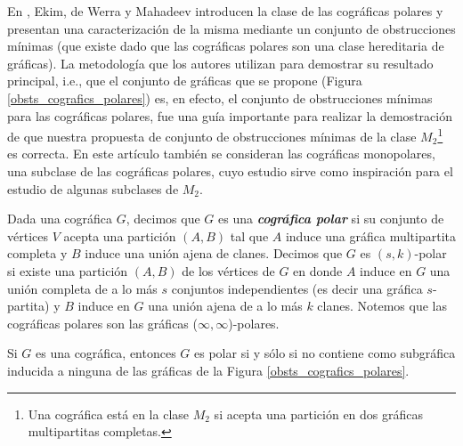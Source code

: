 En \cite{Ekim}, Ekim, de Werra y Mahadeev introducen
la clase de las cográficas polares y presentan una
caracterizaci\'on de la misma mediante un conjunto de
obstrucciones mínimas (que existe dado que las
cográficas polares son una clase hereditaria de gráficas).
La metodología que los autores utilizan para demostrar su
resultado principal, i.e., que el conjunto de gráficas que
se propone (Figura \ref{obsts_cografics_polares}) es, en
efecto, el conjunto de obstrucciones mínimas para las
cográficas polares, fue una gu\'ia importante para realizar
la demostración de que nuestra propuesta de conjunto de
obstrucciones mínimas de la clase $M_2$\footnote{Una
cogr\'afica est\'a en la clase $M_2$ si acepta una
partición en dos gráficas multipartitas completas.} es
correcta.   En este artículo también se consideran las
cográficas monopolares, una subclase de las cográficas
polares, cuyo estudio sirve como inspiración para el
estudio de algunas subclases de $M_2$.

Dada una cogr\'afica $G$, decimos que $G$ es una
\emph{\textbf{cográfica polar}} si su conjunto de vértices
$V$ acepta una partición $(A,B)$ tal que $A$ induce una
gráfica multipartita completa y $B$ induce una unión ajena
de clanes. Decimos que $G$ es $(s,k)$-polar si existe una
partición $(A,B)$ de los vértices de $G$ en donde $A$ induce
en $G$ una unión completa de a lo más $s$ conjuntos
independientes (es decir una gráfica $s$-partita) y $B$
induce en $G$ una unión ajena de a lo más $k$ clanes. Notemos
que las cográficas polares son las gráficas ($\infty,
\infty$)-polares.

\begin{theorem}
  Si $G$ es una cográfica, entonces $G$ es polar si y sólo
  si no contiene como subgráfica inducida a ninguna de las
  gráficas de la Figura \ref{obsts_cografics_polares}.
\end{theorem}

